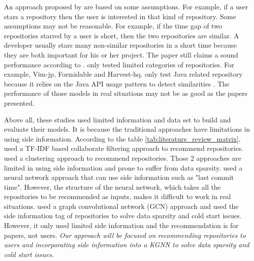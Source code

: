 \documentclass[11pt,twoside]{report}
\begin{document}
An approach proposed by \cite{zhang_detecting_2017} are based on some assumptions. For example, if a user stars a repository then the user is interested in that kind of repository. Some assumptions may not be reasonable. For example, if the time gap of two repositories starred by a user is short, then the two repositories are similar. A developer usually stars many non-similar repositories in a short time because they are both important for his or her project. The paper still claims a sound performance according to \cite{zhang_detecting_2017}. \cite{xu_repersp_2017, sun_personalized_2018, zhang_detecting_2017} only tested limited categories of repositories. For example, Vim-jp, Formidable and Harvest-hq. \cite{sun_personalized_2018} only test Java related repository because it relies on the Java API usage pattern to detect similarities \cite{zhang_detecting_2017}. The performance of those models in real situations may not be as good as the papers presented.

Above all, these studies used limited information and data set to build and evaluate their models. It is because the traditional approaches have limitations in using side information. According to the table \ref{tab:literature_review_matrix}, \cite{zhang_detecting_2017,inka_open_2018,xu_repersp_2017,sun_personalized_2018} used a TF-IDF based collaborate filtering approach to recommend repositories. \cite{guendouz_recommending_2015} used a clustering approach to recommend repositories. Those 2 approaches are limited in using side information and prone to suffer from data sparsity. \cite{liu_recommending_2018} used a neural network approach that can use side information such as "last commit time". However, the structure of the neural network, which takes all the repositories to be recommended as inputs, makes it difficult to work in real situations. \cite{shao_paper2repo_2020} used a graph convolutional network (GCN) approach and used the side information tag of repositories to solve data sparsity and cold start issues. However, it only used limited side information and the recommendation is for papers, not users. \textit{Our approach will be focused on recommending repositories to users and incorporating side information into a KGNN to solve data sparsity and cold start issues.}
\end{document}
